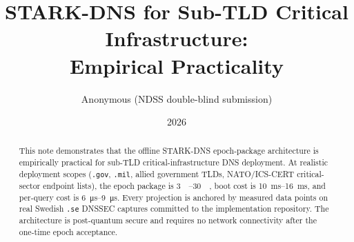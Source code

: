 \documentclass[11pt]{article}
\title{STARK-DNS for Sub-TLD Critical Infrastructure:\\
       Empirical Practicality}
\author{Anonymous (NDSS double-blind submission)}
\date{2026}
\begin{document}
\maketitle

\begin{abstract}
This note demonstrates that the offline STARK-DNS epoch-package
architecture is empirically practical for sub-TLD critical-infrastructure
DNS deployment.  At realistic deployment scopes (\texttt{.gov},
\texttt{.mil}, allied government TLDs, NATO/ICS-CERT critical-sector
endpoint lists), the epoch package is \SI{3}{\mebi\byte}--\SI{30}{\mebi\byte},
boot cost is \SI{10}{\milli\second}--\SI{16}{\milli\second}, and
per-query cost is \SI{6}{\micro\second}--\SI{9}{\micro\second}.  Every
projection is anchored by measured data points on real Swedish
\texttt{.se} DNSSEC captures committed to the implementation repository.
The architecture is post-quantum secure and requires no network
connectivity after the one-time epoch acceptance.
\end{abstract}


\end{document}
